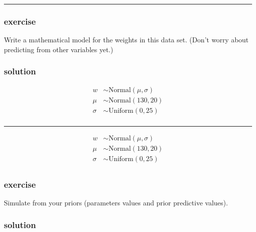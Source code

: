 \documentclass[
  letterpaper,
  DIV=11,
  numbers=noendperiod]{scrartcl}
\newenvironment{Shaded}{\begin{snugshade}}{\end{snugshade}}
\newcommand{\DecValTok}[1]{\textcolor[rgb]{0.68,0.00,0.00}{#1}}
\newcommand{\NormalTok}[1]{\textcolor[rgb]{0.00,0.23,0.31}{#1}}
\newcommand{\OtherTok}[1]{\textcolor[rgb]{0.00,0.23,0.31}{#1}}
\newcommand{\SpecialCharTok}[1]{\textcolor[rgb]{0.37,0.37,0.37}{#1}}
\begin{document}
\begin{Shaded}
\end{Shaded}

\begin{center}\rule{0.5\linewidth}{0.5pt}\end{center}

\subsubsection{exercise}\label{exercise}

Write a mathematical model for the weights in this data set. (Don't
worry about predicting from other variables yet.)

\subsubsection{solution}\label{solution}

\begin{align*}
w &\sim \text{Normal}(\mu, \sigma) \\
\mu &\sim \text{Normal}(130, 20) \\
\sigma &\sim \text{Uniform}(0, 25) \\
\end{align*}

\begin{center}\rule{0.5\linewidth}{0.5pt}\end{center}

\begin{align*}
w &\sim \text{Normal}(\mu, \sigma) \\
\mu &\sim \text{Normal}(130, 20) \\
\sigma &\sim \text{Uniform}(0, 25) \\
\end{align*}

\subsubsection{exercise}\label{exercise-1}

Simulate from your priors (parameters values and prior predictive
values).

\subsubsection{solution}\label{solution-1}
\end{document}
